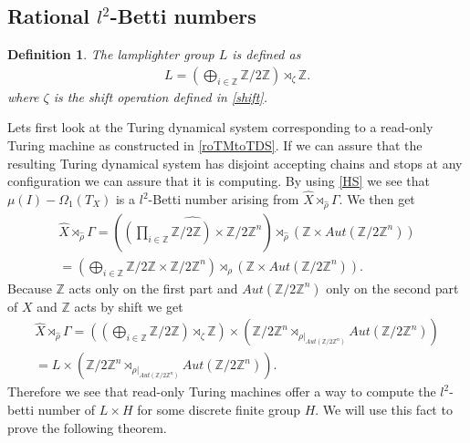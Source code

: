 \documentclass[12pt,a4paper]{scrartcl}
\newtheorem{Definition}[Theorem]{Definition}
\numberwithin{equation}{section}
\newcommand{\Z}{\mathbb{Z}} %
\newcommand{\2}{\mathbb{Z} / 2 \mathbb{Z}}
\newcommand{\1}{\bar{1}}
\newcommand{\0}{\bar{0}}
\begin{document}
\subsection{Rational $l^2$-Betti numbers}
\begin{Definition}
	The lamplighter group $L$ is defined as
	\begin{align*}
		L = (\bigoplus_{i \in \Z} \2) \rtimes_{\zeta} \Z.
	\end{align*}
	where $\zeta$ is the shift operation defined in \ref{shift}.
\end{Definition}
Lets first look at the Turing dynamical system corresponding to a read-only Turing machine as constructed in \ref{roTMtoTDS}. If we can assure that the resulting Turing dynamical system has disjoint accepting chains and stops at any configuration we can assure that it is computing. By using \ref{HS} we see that $\mu (I) - \Omega_1(T_X)$ is a $l^2$-Betti number arising from $\hat{X} \rtimes_{\hat{\rho}} \Gamma$. We then get
\begin{align*}
	\hat{X} \rtimes_{\hat{\rho}} \Gamma = (\widehat{(\prod_{i \in \Z} \2) \times \2^n}) \rtimes_{\hat{\rho}} (\Z \times Aut(\2^n)) \\
	= (\bigoplus_{i \in \Z} \2 \times \2^n) \rtimes_{\rho} (\Z \times Aut(\2^n)).
\end{align*}
Because $\Z$ acts only on the first part and $Aut(\2^n)$ only on the second part of $X$ and $\Z$ acts by shift we get
\begin{align*}
	\hat{X} \rtimes_{\hat{\rho}} \Gamma = ((\bigoplus_{i \in \Z} \2) \rtimes_{\zeta} \Z) \times (\2^n \rtimes_{\rho|_{Aut(\2^n)}} Aut(\2^n)) \\
	= L \times (\2^n \rtimes_{\rho|_{Aut(\2^n)}} Aut(\2^n)).
\end{align*}
Therefore we see that read-only Turing machines offer a way to compute the $l^2$-betti number of $L \times H$ for some discrete finite group $H$. We will use this fact to prove the following theorem.
\end{document}
